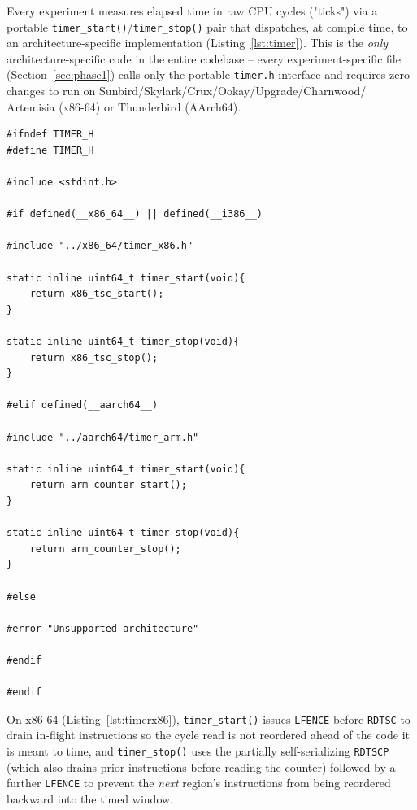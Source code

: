 \documentclass{article}
\begin{document}
Every experiment measures elapsed time in raw CPU cycles ("ticks") via a portable
\texttt{timer\_start()}/\texttt{timer\_stop()} pair that dispatches, at compile time, to an
architecture-specific implementation (Listing~\ref{lst:timer}). This is the \emph{only}
architecture-specific code in the entire codebase -- every experiment-specific file
(Section~\ref{sec:phase1}) calls only the portable \texttt{timer.h} interface and requires
zero changes to run on Sunbird/Skylark/Crux/Ookay/Upgrade/Charnwood/ Artemisia (x86-64) or
Thunderbird (AArch64).

\begin{lstlisting}[caption={Portable timer dispatch. File: \texttt{main\_code/common/timer.h}, commit \texttt{e0f2538}.},label={lst:timer}]
#ifndef TIMER_H
#define TIMER_H

#include <stdint.h>

#if defined(__x86_64__) || defined(__i386__)

#include "../x86_64/timer_x86.h"

static inline uint64_t timer_start(void){
    return x86_tsc_start();
}

static inline uint64_t timer_stop(void){
    return x86_tsc_stop();
}

#elif defined(__aarch64__)

#include "../aarch64/timer_arm.h"

static inline uint64_t timer_start(void){
    return arm_counter_start();
}

static inline uint64_t timer_stop(void){
    return arm_counter_stop();
}

#else

#error "Unsupported architecture"

#endif

#endif
\end{lstlisting}

On x86-64 (Listing~\ref{lst:timerx86}), \texttt{timer\_start()} issues \texttt{LFENCE}
before \texttt{RDTSC} to drain in-flight instructions so the cycle read is not reordered
ahead of the code it is meant to time, and \texttt{timer\_stop()} uses the partially
self-serializing \texttt{RDTSCP} (which also drains prior instructions before reading the
counter) followed by a further \texttt{LFENCE} to prevent the \emph{next} region's
instructions from being reordered backward into the timed window.
\end{document}
